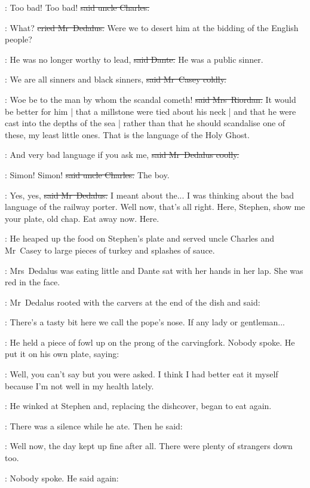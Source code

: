 \charles:
Too bad!
Too bad!
\sout{said uncle Charles.}

\simon:
What?
\sout{cried Mr~Dedalus.}
Were we to desert him
at the bidding of the English people?

\dante:
He was no longer worthy to lead,
\sout{said Dante.}
He was a public sinner.

\casey:
We are all sinners and black sinners,
\sout{said Mr~Casey coldly.}

\dante:
Woe be to the man
by whom the scandal cometh!
\sout{said Mrs~Riordan.}
It would be better for him |
that a millstone were tied about his neck |
and that he were cast into the depths of the sea |
rather than that he should scandalise one of these,
my least little ones.
That is the language of the Holy Ghost.

\simon:
And very bad language
if you ask me,
\sout{said Mr~Dedalus coolly.}

\charles:
Simon!
Simon!
\sout{said uncle Charles.}
The boy.

\simon:
Yes, yes,
\sout{said Mr~Dedalus.}
I meant about the...
I was thinking about the bad language of the railway porter.
Well now, that’s all right.
Here, Stephen,
show me your plate,
old chap.
Eat away now.
Here.

:
He heaped up the food on Stephen’s plate
and served uncle Charles and Mr~Casey
to large pieces of turkey and splashes of sauce.

:
Mrs~Dedalus was eating little
and Dante sat with her hands in her lap.
She was red in the face.

:
Mr~Dedalus rooted with the carvers at the end of the dish
and said:

\simon:
There’s a tasty bit here
we call the pope’s nose.
If any lady or gentleman...

:
He held a piece of fowl up
on the prong of the carvingfork.
Nobody spoke.
He put it on his own plate,
saying:

\simon:
Well, you can’t say but you were asked.
I think I had better eat it myself
because I’m not well in my health lately.

:
He winked at Stephen
and, replacing the dishcover,
began to eat again.

:
There was a silence while he ate.
Then he said:

\simon:
Well now, the day kept up fine after all.
There were plenty of strangers down too.

:
Nobody spoke.
He said again:

